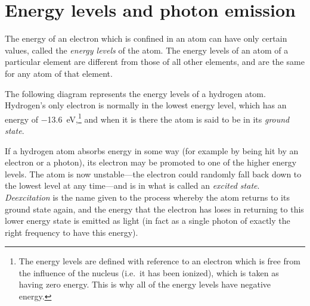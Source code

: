 
\section{Energy levels and photon emission}

The energy of an electron which is confined in an atom can have only certain values, called the \emph{energy levels} of the atom.  The energy levels of an atom of a particular element are different from those of all other elements, and are the same for any atom of that element.

The following diagram represents the energy levels of a hydrogen atom.  Hydrogen's only electron is normally in the lowest energy level, which has an energy of \SI{-13.6}{eV},\footnote{The energy levels are defined with reference to an electron which is free from the influence of the nucleus (i.e.\ it has been ionized), which is taken as having zero energy.  This is why all of the energy levels have negative energy.} and when it is there the atom is said to be in its \emph{ground state}.

If a hydrogen atom absorbs energy in some way (for example by being hit by an electron or a photon), its electron may be promoted to one of the higher energy levels.  The atom is now unstable---the electron could randomly fall back down to the lowest level at any time---and is in what is called an \emph{excited state}.  \emph{Deexcitation} is the name given to the process whereby the atom returns to its ground state again, and the energy that the electron has loses in returning to this lower energy state is emitted as light (in fact as a single photon of exactly the right frequency to have this energy).

\begin{figure}
\end{figure}

